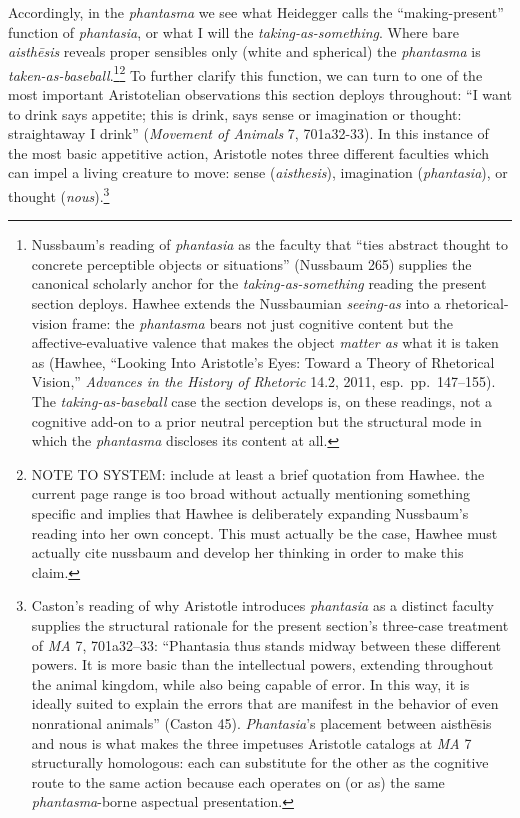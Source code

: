 \documentclass{article}
\begin{document}
Accordingly, in the \textit{phantasma} we see what Heidegger calls the ``making-present'' function of \textit{phantasia}, or what I will the \textit{taking-as-something}. Where bare \textit{aisthēsis} reveals proper sensibles only (white and spherical) the \textit{phantasma} is \textit{taken-as-baseball}.\footnote{Nussbaum's reading of \textit{phantasia} as the faculty that ``ties abstract thought to concrete perceptible objects or situations'' (Nussbaum 265) supplies the canonical scholarly anchor for the \textit{taking-as-something} reading the present section deploys. Hawhee extends the Nussbaumian \textit{seeing-as} into a rhetorical-vision frame: the \textit{phantasma} bears not just cognitive content but the affective-evaluative valence that makes the object \textit{matter as} what it is taken as (Hawhee, ``Looking Into Aristotle's Eyes: Toward a Theory of Rhetorical Vision,'' \textit{Advances in the History of Rhetoric} 14.2, 2011, esp.~pp.~147--155). The \textit{taking-as-baseball} case the section develops is, on these readings, not a cognitive add-on to a prior neutral perception but the structural mode in which the \textit{phantasma} discloses its content at all.}\footnote{NOTE TO SYSTEM: include at least a brief quotation from Hawhee. the current page range is too broad without actually mentioning something specific and implies that Hawhee is deliberately expanding Nussbaum's reading into her own concept. This must actually be the case, Hawhee must actually cite nussbaum and develop her thinking in order to make this claim.} To further clarify this function, we can turn to one of the most important Aristotelian observations this section deploys throughout: ``I want to drink says appetite; this is drink, says sense or imagination or thought: straightaway I drink'' (\textit{Movement of Animals} 7, 701a32-33). In this instance of the most basic appetitive action, Aristotle notes three different faculties which can impel a living creature to move: sense (\textit{aisthesis}), imagination (\textit{phantasia}), or thought (\textit{nous}).\footnote{Caston's reading of why Aristotle introduces \textit{phantasia} as a distinct faculty supplies the structural rationale for the present section's three-case treatment of \textit{MA} 7, 701a32--33: ``Phantasia thus stands midway between these different powers. It is more basic than the intellectual powers, extending throughout the animal kingdom, while also being capable of error. In this way, it is ideally suited to explain the errors that are manifest in the behavior of even nonrational animals'' (Caston 45). \textit{Phantasia}'s placement between aisthēsis and nous is what makes the three impetuses Aristotle catalogs at \textit{MA} 7 structurally homologous: each can substitute for the other as the cognitive route to the same action because each operates on (or as) the same \textit{phantasma}-borne aspectual presentation.} 
\end{document}
